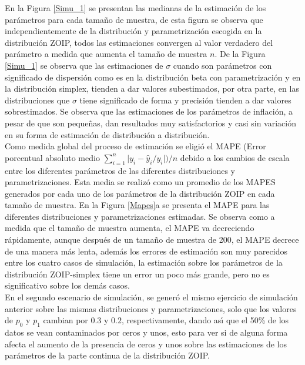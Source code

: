En la Figura \ref{Simu_1} se presentan las medianas de la estimaci\'{o}n de los par\'{a}metros para cada tama\~{n}o de muestra, de esta figura se observa que independientemente de la distribuci\'{o}n y pa\-ra\-me\-tri\-za\-ci\-\'{o}n escogida en la distribuci\'{o}n ZOIP, todos las estimaciones convergen al valor verdadero del par\'{a}metro a medida que aumenta el tama\~{n}o de muestra $n$. De la Figura \ref{Simu_1} se observa que las estimaciones de $\sigma$ cuando son par\'{a}metros con significado de dispersi\'{o}n como es en la distribuci\'{o}n beta con parametrizaci\'{o}n \cite{Stasinopoulos2} y en la distribuci\'{o}n simplex, tienden a dar valores subestimados, por otra parte, en las distribuciones que $\sigma$ tiene significado de forma y precisi\'{o}n tienden a dar valores sobrestimados. Se observa que las estimaciones de los par\'{a}metros de inflaci\'{o}n, a pesar de que son peque\~{n}as, dan resultados muy satisfactorios y casi sin variaci\'{o}n en su forma de estimaci\'{o}n de distribuci\'{o}n a distribuci\'{o}n.\\

Como medida global del proceso de estimaci\'{o}n se eligi\'{o} el MAPE (Error porcentual absoluto medio $\sum_{i=1}^{n}{|y_i-\hat{y}_i/y_i}|)/n$ debido a los cambios de escala entre los diferentes par\'{a}metros de las diferentes distribuciones y parametrizaciones. Esta media se realiz\'{o} como un promedio de los MAPES generados por cada uno de los par\'{a}metros de la distribuci\'{o}n ZOIP en cada tama\~{n}o de muestra. En la Figura \ref{Mapes}a se presenta el MAPE para las diferentes distribuciones y parametrizaciones estimadas. Se observa como a medida que el tama\~{n}o de muestra aumenta, el MAPE va decreciendo r\'{a}pidamente, aunque des\-pu\'{e}s de un tama\~{n}o de muestra de 200, el MAPE decrece de una manera m\'{a}s lenta, adem\'{a}s los errores de estimaci\'{o}n son muy parecidos entre los cuatro casos de simulaci\'{o}n, la estimaci\'{o}n sobre los par\'{a}metros de la distribuci\'{o}n ZOIP-simplex tiene un error un poco m\'{a}s grande, pero no es significativo sobre los dem\'{a}s casos.\\
 
En el segundo escenario de simulaci\'{o}n, se gener\'{o} el mismo ejercicio de simulaci\'{o}n anterior sobre las mismas distribuciones y parametrizaciones, solo que los valores de $p_0$ y $p_1$ cambian por $0.3$ y $0.2$, respectivamente, dando as\'{\i} que el 50\% de los datos se vean contaminados por ceros y unos, esto para ver si de alguna forma afecta el aumento de la presencia de ceros y unos sobre las estimaciones de los par\'{a}metros de la parte continua de la distribuci\'{o}n ZOIP.\\

